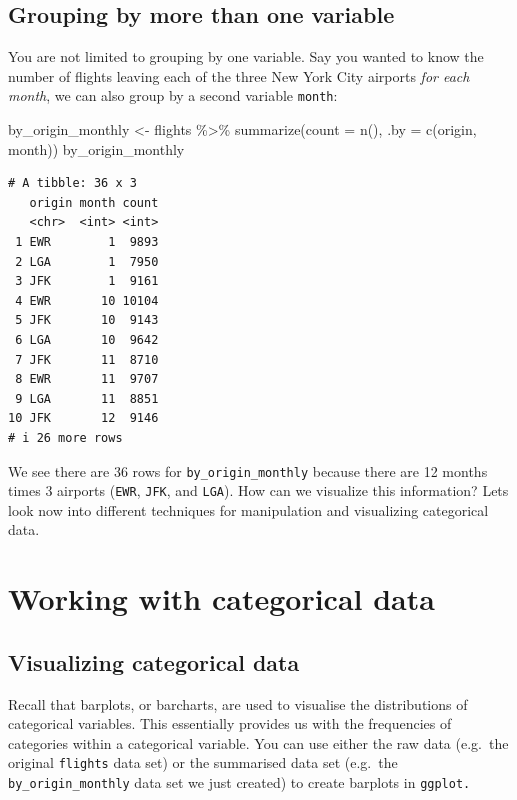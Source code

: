 \documentclass[
  letterpaper,
  DIV=11,
  numbers=noendperiod]{scrartcl}
\newenvironment{Shaded}{\begin{snugshade}}{\end{snugshade}}
\newcommand{\AttributeTok}[1]{\textcolor[rgb]{0.40,0.45,0.13}{#1}}
\newcommand{\FunctionTok}[1]{\textcolor[rgb]{0.28,0.35,0.67}{#1}}
\newcommand{\NormalTok}[1]{\textcolor[rgb]{0.00,0.23,0.31}{#1}}
\newcommand{\OtherTok}[1]{\textcolor[rgb]{0.00,0.23,0.31}{#1}}
\newcommand{\SpecialCharTok}[1]{\textcolor[rgb]{0.37,0.37,0.37}{#1}}
\begin{document}
\subsection{Grouping by more than one
variable}\label{grouping-by-more-than-one-variable}

You are not limited to grouping by one variable. Say you wanted to know
the number of flights leaving each of the three New York City airports
\emph{for each month}, we can also group by a second variable
\texttt{month}:

\begin{Shaded}
\begin{Highlighting}[]
\NormalTok{by\_origin\_monthly }\OtherTok{\textless{}{-}}\NormalTok{ flights }\SpecialCharTok{\%\textgreater{}\%}
  \FunctionTok{summarize}\NormalTok{(}\AttributeTok{count =} \FunctionTok{n}\NormalTok{(),}
            \AttributeTok{.by =} \FunctionTok{c}\NormalTok{(origin, month))}
\NormalTok{by\_origin\_monthly}
\end{Highlighting}
\end{Shaded}

\begin{verbatim}
# A tibble: 36 x 3
   origin month count
   <chr>  <int> <int>
 1 EWR        1  9893
 2 LGA        1  7950
 3 JFK        1  9161
 4 EWR       10 10104
 5 JFK       10  9143
 6 LGA       10  9642
 7 JFK       11  8710
 8 EWR       11  9707
 9 LGA       11  8851
10 JFK       12  9146
# i 26 more rows
\end{verbatim}

We see there are 36 rows for \texttt{by\_origin\_monthly} because there
are 12 months times 3 airports (\texttt{EWR}, \texttt{JFK}, and
\texttt{LGA}). How can we visualize this information? Lets look now into
different techniques for manipulation and visualizing categorical data.

\section{Working with categorical
data}\label{working-with-categorical-data}

\subsection{Visualizing categorical
data}\label{visualizing-categorical-data}

Recall that barplots, or barcharts, are used to visualise the
distributions of categorical variables. This essentially provides us
with the frequencies of categories within a categorical variable. You
can use either the raw data (e.g.~the original \texttt{flights} data
set) or the summarised data set (e.g.~the \texttt{by\_origin\_monthly}
data set we just created) to create barplots in \texttt{ggplot.}
\end{document}
